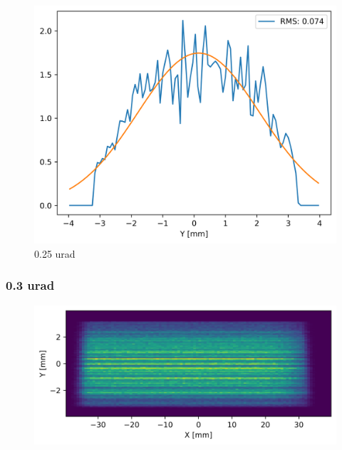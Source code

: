 \begin{figure}[H]
\centering
\includegraphics[width=0.9\linewidth]{./../figures/slope_error/WB4C_d30_d-spacing_gradient_45keV_slope_error025urad_Yprofile.png}
\caption{0.25 urad}
\label{fig:025urad}
\end{figure}

\clearpage
\subsubsection{0.3 urad}
\begin{figure}[H]
\centering
\includegraphics[width=0.9\linewidth]{./../figures/slope_error/WB4C_d30_d-spacing_gradient_45keV_slope_error03urad.png}
\end{figure}

